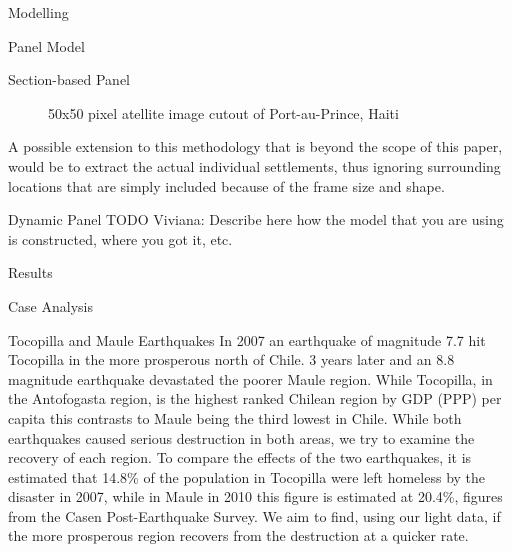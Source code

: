 \documentclass[12pt,fleqn,leqno,letterpaper]{article}
\begin{document}
\begin{section}{Modelling}
\begin{subsection}{Panel Model}
\begin{subsubsection}{Section-based Panel}
\begin{figure}
        \caption{50x50 pixel atellite image cutout of Port-au-Prince, Haiti}
      \end{figure}
      A possible extension to this methodology that is beyond the scope of this paper, would be to extract the actual individual settlements, thus ignoring surrounding locations that are simply included because of the frame size and shape.
    \end{subsubsection}
    \begin{subsubsection}{Dynamic Panel}
      TODO Viviana: Describe here how the model that you are using is constructed, where you got it, etc.
    \end{subsubsection}
  \end{subsection}
\end{section}

\begin{section}{Results}
  \begin{subsection}{Case Analysis}
    \begin{subsubsection}{Tocopilla and Maule Earthquakes}
			In 2007 an earthquake of magnitude 7.7 hit Tocopilla in the more prosperous north of Chile. 3 years later and an 8.8 magnitude earthquake devastated the poorer Maule region. While Tocopilla, in the Antofogasta region, is the highest ranked Chilean region by GDP (PPP) per capita this contrasts to Maule being the third lowest in Chile. While both earthquakes caused serious destruction in both areas, we try to examine the recovery of each region. To compare the effects of the two earthquakes, it is estimated that 14.8\% of the population in Tocopilla were left homeless by the disaster in 2007, while in Maule in 2010 this figure is estimated at 20.4\%, figures from the Casen Post-Earthquake Survey. We aim to find, using our light data, if the more prosperous region recovers from the destruction at a quicker rate. \\

\end{subsubsection}
\end{subsection}
\end{section}
\end{document}

